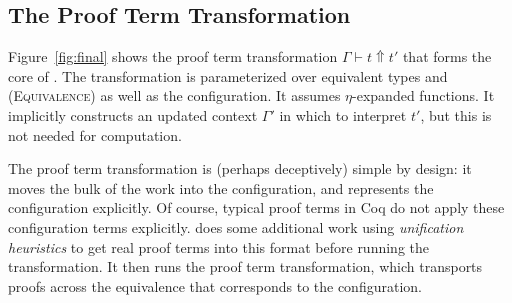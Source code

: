 \subsection{The Proof Term Transformation}
\label{sec:generic}

Figure~\ref{fig:final} shows the proof term transformation $\Gamma \vdash t \Uparrow t'$ that forms the core of \toolname.
The transformation is parameterized over equivalent types \A and \B (\textsc{Equivalence})
as well as the configuration. %
It assumes $\eta$-expanded functions.
It implicitly constructs an updated context $\Gamma'$ in which to interpret $t'$, but this is not needed for computation.

The proof term transformation is (perhaps deceptively) simple by design:
it moves the bulk of the work into the configuration,
and represents the configuration explicitly.
Of course, typical proof terms in Coq do not apply these configuration
terms explicitly.
\toolname does some additional work using \textit{unification heuristics} to get real proof terms into this format before running the transformation.
It then runs the proof term transformation, which transports proofs across the equivalence that corresponds to the configuration.

